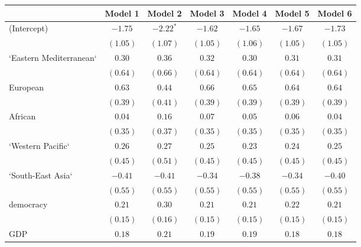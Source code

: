 
\begin{table}[!h]
\begin{center}
\begin{tabular}{l c c c c c c }
\toprule
 & Model 1 & Model 2 & Model 3 & Model 4 & Model 5 & Model 6 \\
\midrule
(Intercept)             & $-1.75$      & $-2.22^{*}$  & $-1.62$      & $-1.65$      & $-1.67$      & $-1.73$      \\
                        & $(1.05)$     & $(1.07)$     & $(1.05)$     & $(1.06)$     & $(1.05)$     & $(1.05)$     \\
`Eastern Mediterranean` & $0.30$       & $0.36$       & $0.32$       & $0.30$       & $0.31$       & $0.31$       \\
                        & $(0.64)$     & $(0.66)$     & $(0.64)$     & $(0.64)$     & $(0.64)$     & $(0.64)$     \\
European                & $0.63$       & $0.44$       & $0.66$       & $0.65$       & $0.64$       & $0.64$       \\
                        & $(0.39)$     & $(0.41)$     & $(0.39)$     & $(0.39)$     & $(0.39)$     & $(0.39)$     \\
African                 & $0.04$       & $0.16$       & $0.07$       & $0.05$       & $0.06$       & $0.04$       \\
                        & $(0.35)$     & $(0.37)$     & $(0.35)$     & $(0.35)$     & $(0.35)$     & $(0.35)$     \\
`Western Pacific`       & $0.26$       & $0.27$       & $0.25$       & $0.23$       & $0.24$       & $0.25$       \\
                        & $(0.45)$     & $(0.51)$     & $(0.45)$     & $(0.45)$     & $(0.45)$     & $(0.45)$     \\
`South-East Asia`       & $-0.41$      & $-0.41$      & $-0.34$      & $-0.38$      & $-0.34$      & $-0.40$      \\
                        & $(0.55)$     & $(0.55)$     & $(0.55)$     & $(0.55)$     & $(0.55)$     & $(0.55)$     \\
democracy               & $0.21$       & $0.30$       & $0.21$       & $0.21$       & $0.22$       & $0.21$       \\
                        & $(0.15)$     & $(0.16)$     & $(0.15)$     & $(0.15)$     & $(0.15)$     & $(0.15)$     \\
GDP                     & $0.18$       & $0.21$       & $0.19$       & $0.19$       & $0.18$       & $0.18$       \\

\end{tabular}
\end{center}
\end{table}
